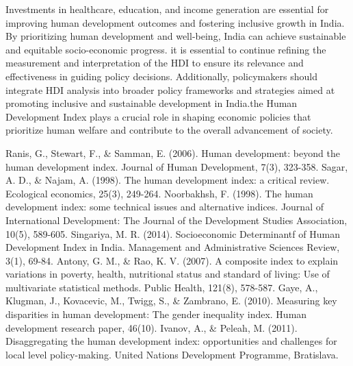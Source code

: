 \documentclass[12pt]{report}
\begin{document}
Investments in healthcare, education, and income generation are essential for improving human development outcomes and fostering inclusive growth in India. By prioritizing human development and well-being, India can achieve sustainable and equitable socio-economic progress. it is essential to continue refining the measurement and interpretation of the HDI to ensure its relevance and effectiveness in guiding policy decisions. Additionally, policymakers should integrate HDI analysis into broader policy frameworks and strategies aimed at promoting inclusive and sustainable development in India.the Human Development Index plays a crucial role in shaping economic policies that prioritize human welfare and contribute to the overall advancement of society.


\newpage
\renewcommand{\bibname}{References}
\begin{thebibliography}{}
    Ranis, G., Stewart, F., \& Samman, E. (2006). Human development: beyond the human development index. Journal of Human Development, 7(3), 323-358.
    Sagar, A. D., \& Najam, A. (1998). The human development index: a critical review. Ecological economics, 25(3), 249-264.
    Noorbakhsh, F. (1998). The human development index: some technical issues and alternative indices. Journal of International Development: The Journal of the Development Studies Association, 10(5), 589-605.
    Singariya, M. R. (2014). Socioeconomic Determinantf of Human Development Index in India. Management and Administrative Sciences Review, 3(1), 69-84.
    Antony, G. M., \& Rao, K. V. (2007). A composite index to explain variations in poverty, health, nutritional status and standard of living: Use of multivariate statistical methods. Public Health, 121(8), 578-587.
    Gaye, A., Klugman, J., Kovacevic, M., Twigg, S., \& Zambrano, E. (2010). Measuring key disparities in human development: The gender inequality index. Human development research paper, 46(10).
    Ivanov, A., \& Peleah, M. (2011). Disaggregating the human development index: opportunities and challenges for local level policy-making. United Nations Development Programme, Bratislava.
\end{thebibliography}
\end{document}
